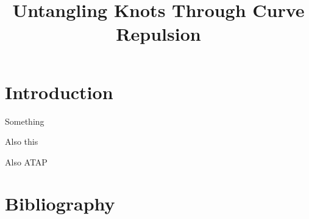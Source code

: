 \documentclass[a4paper, 12pt]{article}
\title{Untangling Knots Through Curve Repulsion}
\begin{document}

\section{Introduction}


Something \cite{YSC2021}

Also this \cite{BO1995}

Also ATAP \cite{Trefethen_2020}

\section{Bibliography}
\printbibliography
\end{document}
